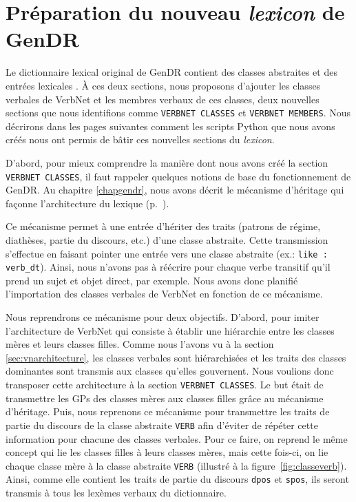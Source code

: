  
\section{Préparation du nouveau \emph{lexicon} de GenDR}

Le dictionnaire lexical original de GenDR contient des classes abstraites et des entrées lexicales . À ces deux sections, nous proposons d'ajouter les classes verbales de VerbNet et les membres verbaux de ces classes, deux nouvelles sections que nous identifions comme \texttt{VERBNET CLASSES} et \texttt{VERBNET MEMBERS}. Nous décrirons dans les pages suivantes comment les scripts Python que nous avons créés nous ont permis de bâtir ces nouvelles sections du \emph{lexicon}.

D'abord, pour mieux comprendre la manière dont nous avons créé la section \texttt{VERBNET CLASSES}, il faut rappeler quelques notions de base du fonctionnement de GenDR. Au chapitre \ref{chapgendr}, nous avons décrit le mécanisme d'héritage qui façonne l'architecture du lexique (p.~\pageref{sec:dictio}). 

Ce mécanisme permet à une entrée d'hériter des traits (patrons de régime, diathèses, partie du discours, etc.) d'une classe abstraite. Cette transmission s'effectue en faisant pointer une entrée vers une classe abstraite (ex.: \texttt{like : verb\_dt}). Ainsi, nous n'avons pas à réécrire pour chaque verbe transitif qu'il prend un sujet et objet direct, par exemple. Nous avons donc planifié l'importation des classes verbales de VerbNet en fonction de ce mécanisme.  

Nous reprendrons ce mécanisme pour deux objectifs. D'abord, pour imiter l'architecture de VerbNet qui consiste à établir une hiérarchie entre les classes mères et leurs classes filles. Comme nous l'avons vu à la section \ref{sec:vnarchitecture}, les classes verbales sont hiérarchisées et les traits des classes dominantes sont transmis aux classes qu'elles gouvernent. Nous voulions donc transposer cette architecture à la section \texttt{VERBNET CLASSES}. Le but était de transmettre les \acp{GP} des classes mères aux classes filles grâce au mécanisme d'héritage. Puis, nous reprenons ce mécanisme pour transmettre les traits de partie du discours de la classe abstraite \texttt{VERB} afin d'éviter de répéter cette information pour chacune des classes verbales. Pour ce faire, on reprend le même concept qui lie les classes filles à leurs classes mères, mais cette fois-ci, on lie chaque classe mère à la classe abstraite \texttt{VERB} (illustré à la figure~\ref{fig:classeverb}). Ainsi, comme elle contient les traits de partie du discours \texttt{dpos} et \texttt{spos}, ils seront transmis à tous les lexèmes verbaux du dictionnaire.

